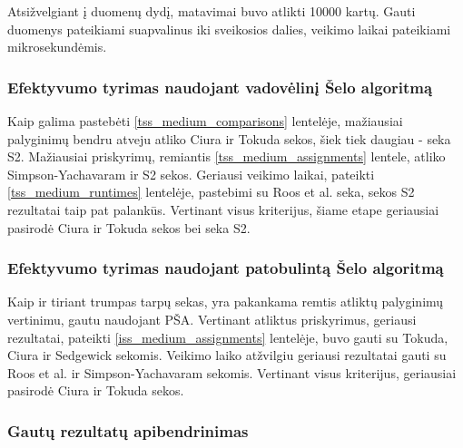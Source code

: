 \documentclass{VUMIFInfKursinis}
\begin{document}
Atsižvelgiant į duomenų dydį, matavimai buvo atlikti 10000 kartų.
Gauti duomenys pateikiami suapvalinus iki sveikosios dalies, veikimo laikai pateikiami mikrosekundėmis.

\subsubsection{Efektyvumo tyrimas naudojant vadovėlinį Šelo algoritmą}

Kaip galima pastebėti \ref{tss_medium_comparisons} lentelėje, mažiausiai palyginimų bendru atveju atliko Ciura ir Tokuda sekos, šiek tiek daugiau - seka S2.
Mažiausiai priskyrimų, remiantis \ref{tss_medium_assignments} lentele, atliko Simpson-Yachavaram ir S2 sekos.
Geriausi veikimo laikai, pateikti \ref{tss_medium_runtimes} lentelėje, pastebimi su Roos et al. seka, sekos S2 rezultatai taip pat palankūs.
Vertinant visus kriterijus, šiame etape geriausiai pasirodė Ciura ir Tokuda sekos bei seka S2.

\subsubsection{Efektyvumo tyrimas naudojant patobulintą Šelo algoritmą}

Kaip ir tiriant trumpas tarpų sekas, yra pakankama remtis atliktų palyginimų vertinimu, gautu naudojant PŠA.
Vertinant atliktus priskyrimus, geriausi rezultatai, pateikti \ref{iss_medium_assignments} lentelėje, buvo gauti su Tokuda, Ciura ir Sedgewick sekomis.
Veikimo laiko atžvilgiu geriausi rezultatai gauti su Roos et al. ir Simpson-Yachavaram sekomis.
Vertinant visus kriterijus, geriausiai pasirodė Ciura ir Tokuda sekos.

\subsubsection{Gautų rezultatų apibendrinimas}
\end{document}
